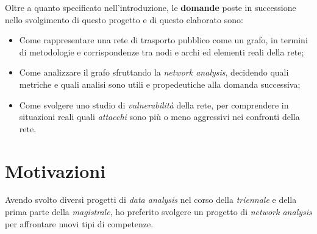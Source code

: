 Oltre a quanto specificato nell'introduzione, le \textbf{domande} poste in successione nello svolgimento di questo progetto e di questo elaborato sono:
\begin{itemize}
    \item Come rappresentare una rete di trasporto pubblico come un grafo, in termini di metodologie e corrispondenze tra nodi e archi ed elementi reali della rete;
    \item Come analizzare il grafo sfruttando la \textit{network analysis}, decidendo quali metriche e quali analisi sono utili e propedeutiche alla domanda successiva;
    \item Come svolgere uno studio di \textit{vulnerabilità} della rete, per comprendere in situazioni reali quali \textit{attacchi} sono più o meno aggressivi nei confronti della rete.
\end{itemize}

\section*{Motivazioni}
Avendo svolto diversi progetti di \textit{data analysis} nel corso della \textit{triennale} e della prima parte della \textit{magistrale}, ho preferito svolgere un progetto di \textit{network analysis} per affrontare nuovi tipi di competenze.
